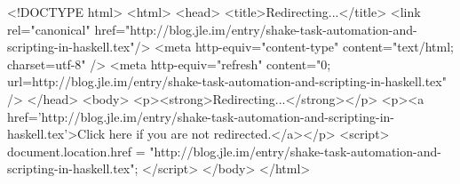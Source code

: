 <!DOCTYPE html>
<html>
<head>
<title>Redirecting...</title>
<link rel="canonical" href="http://blog.jle.im/entry/shake-task-automation-and-scripting-in-haskell.tex"/>
<meta http-equiv="content-type" content="text/html; charset=utf-8" />
<meta http-equiv="refresh" content="0; url=http://blog.jle.im/entry/shake-task-automation-and-scripting-in-haskell.tex" />
</head>
<body>
  <p><strong>Redirecting...</strong></p>
  <p><a href='http://blog.jle.im/entry/shake-task-automation-and-scripting-in-haskell.tex'>Click here if you are not redirected.</a></p>
  <script>
    document.location.href = "http://blog.jle.im/entry/shake-task-automation-and-scripting-in-haskell.tex";
  </script>
</body>
</html>
